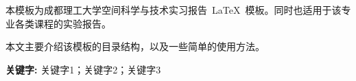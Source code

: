 \begin{center}
    \LARGE{}
\end{center}
\par\vspace{2.5 ex}

\begin{cnabstract}
    本模板为成都理工大学空间科学与技术实习报告~\LaTeX~模板。同时也适用于该专业各类课程的实验报告。

    本文主要介绍该模板的目录结构，以及一些简单的使用方法。
\end{cnabstract}
\noindent\textbf{关键字: } 关键字1；关键字2；关键字3

